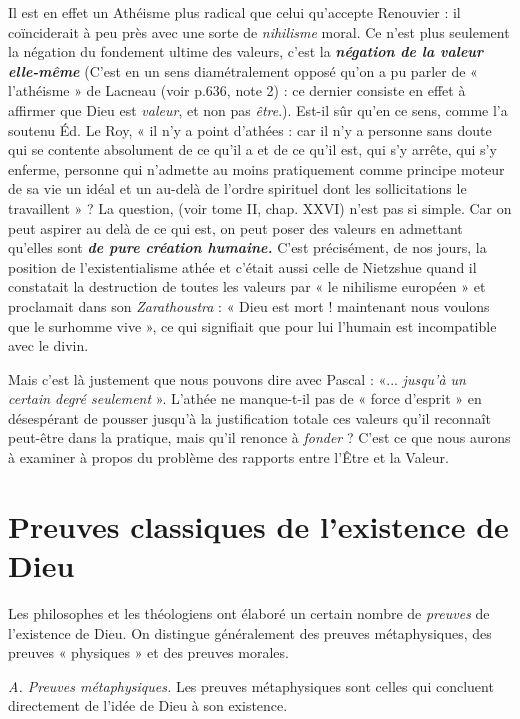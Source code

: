 Il est en effet un Athéisme plus radical que celui qu’accepte
Renouvier : il coïnciderait à peu près avec une sorte de {\it nihilisme}
moral. Ce n’est plus seulement la négation du fondement ultime
des valeurs, c’est la \textbf{\textit {négation de la valeur elle-même}}
{\scriptsize (C'est en un sens diamétralement opposé qu'on a pu parler de « l’athéisme » de
Lacneau (voir p.636, note 2) : ce dernier consiste en effet à affirmer que Dieu est {\it valeur},
et non pas {\it être}.)}.
Est-il sûr
qu’en ce sens, comme l’a soutenu Éd. Le Roy, « il n’y a point
d’athées : car il n’y a personne sans doute qui se contente absolument
de ce qu'il a et de ce qu’il est, qui s’y arrête, qui s’y enferme, personne
qui n’admette au moins pratiquement comme principe moteur de sa
vie un idéal et un au-delà de l’ordre spirituel dont les sollicitations le
travaillent » ? La question, (voir tome II, chap. XXVI) n’est pas si
simple. Car on peut aspirer au delà de ce qui est, on peut poser des
valeurs en admettant qu’elles sont \textbf{\textit {de pure création humaine.}}
C’est précisément, de nos jours, la position de l’existentialisme athée
et c'était aussi celle de Nietzshue quand il constatait la destruction
de toutes les valeurs par « le nihilisme européen » et proclamait dans
son {\it Zarathoustra} : « Dieu est mort ! maintenant nous voulons que le
surhomme vive », ce qui signifiait que pour lui l’humain est incompatible
avec le divin.

Mais c’est là justement que nous pouvons dire avec Pascal : «... {\it jusqu’à
un certain degré seulement} ». L’athée ne manque-t-il pas de « force
d'esprit » en désespérant de pousser jusqu’à la justification totale
ces valeurs qu’il reconnaît peut-être dans la pratique, mais qu’il
renonce à {\it fonder} ? C’est ce que nous aurons à examiner à propos
du problème des rapports entre l’Être et la Valeur.

\section{Preuves classiques de l’existence de Dieu}%
Les philosophes
et les théologiens ont élaboré un certain nombre de {\it preuves} de
l’existence de Dieu. On distingue généralement des preuves métaphysiques,
des preuves « physiques » et des preuves morales.

{\it A. Preuves métaphysiques.} Les preuves métaphysiques sont celles
qui concluent directement de l’idée de Dieu à son existence.

